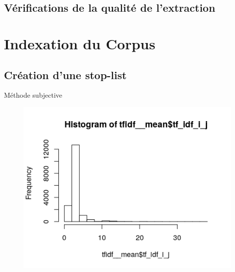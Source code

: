 \documentclass{article}
\begin{document}
\subsection{Vérifications de la qualité de l'extraction}

\section{Indexation du Corpus}

\subsection{Création d'une stop-list}


Méthode subjective
\begin{figure}
\begin{center}
\includegraphics{rapport/hist_tfidf.png}
\end{center}
\end{figure}
\end{document}
